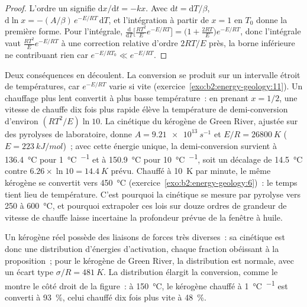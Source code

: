 \begin{proof}
L'ordre un signifie $\mathrm{d}x/\mathrm{d}t = -k x$. Avec $\mathrm{d}t = \mathrm{d}T/\beta$,
$\mathrm{d}\ln x = -(A/\beta)\,e^{-E/RT}\,\mathrm{d}T$, et l'intégration à partir de $x = 1$ en $T_0$ donne
la première forme. Pour l'intégrale, $\frac{\mathrm{d}}{\mathrm{d}T}\bigl[\frac{RT^2}{E}e^{-E/RT}\bigr]
= \bigl(1 + \frac{2RT}{E}\bigr)e^{-E/RT}$, donc l'intégrale vaut $\frac{RT^2}{E}e^{-E/RT}$ à une
correction relative d'ordre $2RT/E$ près, la borne inférieure ne contribuant rien car $e^{-E/RT_0} \ll
e^{-E/RT}$.
\end{proof}

Deux conséquences en découlent. La conversion se produit sur un intervalle étroit de températures, car
$e^{-E/RT}$ varie si vite (exercice~\ref{exo:b2:energy-geology:11}). Un chauffage plus lent convertit
à plus basse température~: en prenant $x = 1/2$, une vitesse de chauffe dix fois plus rapide élève la température de demi-conversion
d'environ $(RT^2/E)\ln 10$. La cinétique du kérogène de Green River, ajustée sur des pyrolyses de laboratoire, donne $A = \qty{9.21e13}{s^{-1}}$ et $E/R = \qty{26800}{K}$ ($E =
\qty{223}{kJ/mol}$)~; avec cette énergie unique, la demi-conversion survient à \qty{136.4}{\celsius} pour \qty{1}{\celsius\per\Ma}
et à \qty{150.9}{\celsius} pour \qty{10}{\celsius\per\Ma}, soit un décalage de
\qty{14.5}{\celsius} contre $6.26 \times \ln 10 = \qty{14.4}{K}$ prévu. Chauffé à
\qty{10}{K} par minute, le même kérogène se convertit vers \qty{450}{\celsius}
(exercice~\ref{exo:b2:energy-geology:6})~: le temps tient lieu de température. C'est pourquoi la cinétique se mesure par pyrolyse
vers 250 à \qty{600}{\celsius}, et pourquoi extrapoler ces lois sur douze ordres de grandeur
de vitesse de chauffe laisse incertaine
la profondeur prévue de la fenêtre à huile.

Un kérogène réel possède des liaisons de forces très diverses~: sa cinétique est donc une distribution d'énergies d'activation, chaque fraction
obéissant à la proposition~; pour le kérogène de Green River, la distribution est normale,
avec un écart type $\sigma/R = \qty{481}{K}$.
La distribution élargit la conversion, comme le montre le côté droit de la figure~: à \qty{150}{\celsius}, le kérogène chauffé à
\qty{1}{\celsius\per\Ma} est converti à \qty{93}{\percent}, celui chauffé dix fois plus vite
à \qty{48}{\percent}.

